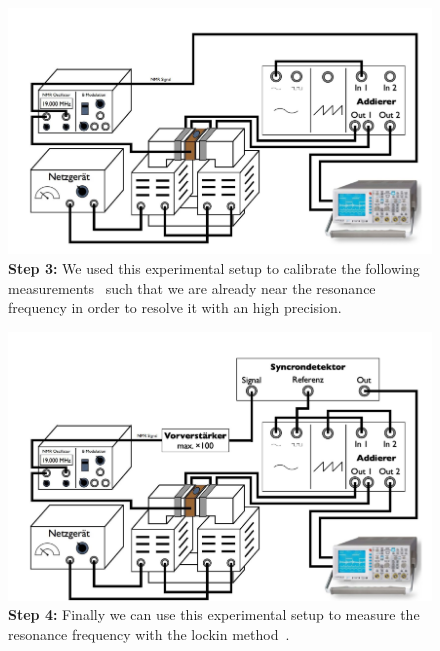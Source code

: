 \begin{figure}[htpb]
    \centering
    \includegraphics[width=0.8\linewidth]{figures/setup3}
    \caption{\textbf{Step 3:}
        We used this experimental setup to calibrate the following
        measurements~\cite{ver} such that we are already
        near the resonance frequency in order to resolve it with an high
        precision.}
    \label{fig:figures/setup1}
\end{figure}
\begin{figure}[htpb]
    \centering
    \includegraphics[width=0.8\linewidth]{figures/setup4}
    \caption{\textbf{Step 4:}
        Finally we can use this experimental setup to measure
        the resonance frequency with the lockin method~\cite{ver}.}

    \label{fig:figures/setup1}
\end{figure}
\clearpage




